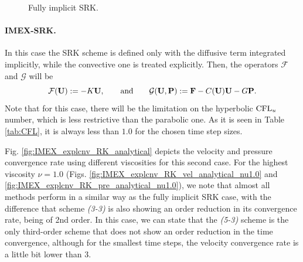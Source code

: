 \begin{figure}[h!]
  \caption{Fully implicit SRK.}
  \label{fig:IMEX_implcnv_RK_analytical}
\end{figure}

\paragraph{IMEX-SRK.}

In this case the SRK scheme is defined only with the diffusive term integrated implicitly, while the convective one is treated explicitly. Then, the operators $\mathcal{F}$ and $\mathcal{G}$ will be
$$\mathcal{F}({\bf U}):=-K{\bf U},\quad\quad\mbox{and}\quad\quad\mathcal{G}({\bf U},{\bf P}):={\bf F}-C({\bf U}){\bf U}-G{\bf P}.$$
Note that for this case, there will be the limitation on the hyperbolic ${\rm CFL}_u$ number, which is less restrictive than the parabolic one. As it is seen in Table \ref{tab:CFL}, it is always less than $1.0$ for the chosen time step sizes.

Fig. \ref{fig:IMEX_explcnv_RK_analytical} depicts the velocity and pressure convergence rate using different viscosities for this second case. 
For the highest viscosity $\nu=1.0$ (Figs. \ref{fig:IMEX_explcnv_RK_vel_analytical_nu1.0} and \ref{fig:IMEX_explcnv_RK_pre_analytical_nu1.0}), we note that almost all methods perform in a similar way as the fully implicit SRK case, with the difference that scheme \textit{(3-3)} is also showing an order reduction in its convergence rate, being of 2nd order. In this case, we can state that the \textit{(5-3)} scheme is the only third-order scheme that does not show an order reduction in the time convergence, although for the smallest time steps, the velocity convergence rate is a little bit lower than 3.

